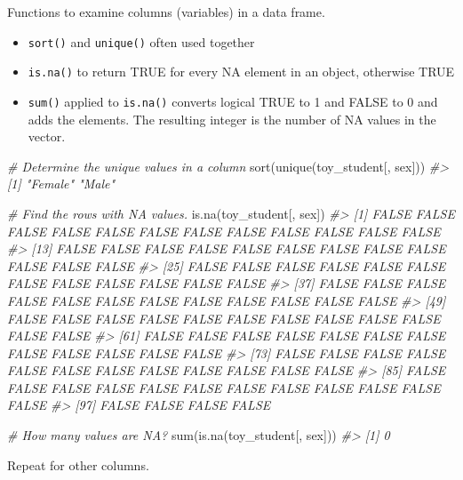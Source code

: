 \documentclass[
]{book}
\newenvironment{Shaded}{\begin{snugshade}}{\end{snugshade}}
\newcommand{\CommentTok}[1]{\textcolor[rgb]{0.56,0.35,0.01}{\textit{#1}}}
\newcommand{\FunctionTok}[1]{\textcolor[rgb]{0.00,0.00,0.00}{#1}}
\newcommand{\NormalTok}[1]{#1}
\providecommand{\tightlist}{%
  \setlength{\itemsep}{0pt}\setlength{\parskip}{0pt}}
\begin{document}
Functions to examine columns (variables) in a data frame.

\begin{itemize}
\tightlist
\item
  \texttt{sort()} and \texttt{unique()} often used together
\item
  \texttt{is.na()} to return TRUE for every NA element in an object, otherwise TRUE
\item
  \texttt{sum()} applied to \texttt{is.na()} converts logical TRUE to 1 and FALSE to 0 and adds the elements. The resulting integer is the number of NA values in the vector.
\end{itemize}

\begin{Shaded}
\begin{Highlighting}[]
\CommentTok{\# Determine the unique values in a column }
\FunctionTok{sort}\NormalTok{(}\FunctionTok{unique}\NormalTok{(toy\_student[, sex]))}
\CommentTok{\#\textgreater{} [1] "Female" "Male"}

\CommentTok{\# Find the rows with NA values.}
\FunctionTok{is.na}\NormalTok{(toy\_student[, sex])}
\CommentTok{\#\textgreater{}   [1] FALSE FALSE FALSE FALSE FALSE FALSE FALSE FALSE FALSE FALSE FALSE FALSE}
\CommentTok{\#\textgreater{}  [13] FALSE FALSE FALSE FALSE FALSE FALSE FALSE FALSE FALSE FALSE FALSE FALSE}
\CommentTok{\#\textgreater{}  [25] FALSE FALSE FALSE FALSE FALSE FALSE FALSE FALSE FALSE FALSE FALSE FALSE}
\CommentTok{\#\textgreater{}  [37] FALSE FALSE FALSE FALSE FALSE FALSE FALSE FALSE FALSE FALSE FALSE FALSE}
\CommentTok{\#\textgreater{}  [49] FALSE FALSE FALSE FALSE FALSE FALSE FALSE FALSE FALSE FALSE FALSE FALSE}
\CommentTok{\#\textgreater{}  [61] FALSE FALSE FALSE FALSE FALSE FALSE FALSE FALSE FALSE FALSE FALSE FALSE}
\CommentTok{\#\textgreater{}  [73] FALSE FALSE FALSE FALSE FALSE FALSE FALSE FALSE FALSE FALSE FALSE FALSE}
\CommentTok{\#\textgreater{}  [85] FALSE FALSE FALSE FALSE FALSE FALSE FALSE FALSE FALSE FALSE FALSE FALSE}
\CommentTok{\#\textgreater{}  [97] FALSE FALSE FALSE FALSE}

\CommentTok{\# How many values are NA?}
\FunctionTok{sum}\NormalTok{(}\FunctionTok{is.na}\NormalTok{(toy\_student[, sex]))}
\CommentTok{\#\textgreater{} [1] 0}
\end{Highlighting}
\end{Shaded}

Repeat for other columns.
\end{document}
